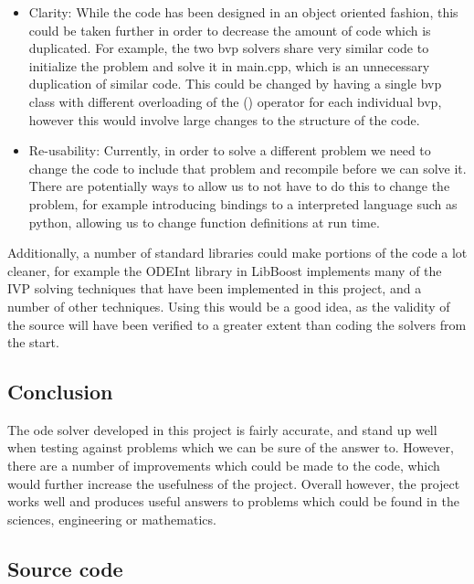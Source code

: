 \documentclass[a4paper,11pt]{report}
\begin{document}
{{{\begin{itemize}
	\item Clarity: While the code has been designed in an object oriented fashion, this could be taken further in order to decrease the amount of code which is duplicated. For example, the two bvp solvers share very similar code to initialize the problem and solve it in main.cpp, which is an unnecessary duplication of similar code. This could be changed by having a single bvp class with different overloading of the () operator for each individual bvp, however this would involve large changes to the structure of the code.
	\item Re-usability: Currently, in order to solve a different problem we need to change the code to include that problem and recompile before we can solve it. There are potentially ways to allow us to not have to do this to change the problem, for example introducing bindings to a interpreted language such as python, allowing us to change function definitions at run time. 
\end{itemize}

Additionally, a number of standard libraries could make portions of the code a lot cleaner, for example the ODEInt library in LibBoost \cite{odeint} implements many of the IVP solving techniques that have been implemented in this project, and a number of other techniques. Using this would be a good idea, as the validity of the source will have been verified to a greater extent than coding the solvers from the start.

\section{Conclusion}

The ode solver developed in this project is fairly accurate, and stand up well when testing against problems which we can be sure of the answer to. However, there are a number of improvements which could be made to the code, which would further increase the usefulness of the project. Overall however, the project works well and produces useful answers to problems which could be found in the sciences, engineering or mathematics.

\begin{appendix}

\chapter{Source code}


\end{appendix}}}}
\end{document}
